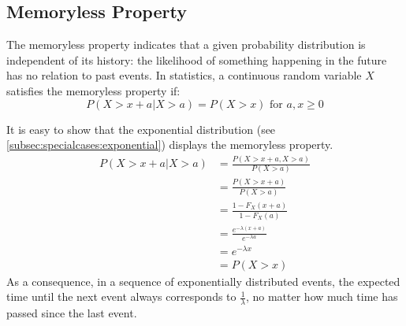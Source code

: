 \documentclass[12pt]{article}
\begin{document}

\pagebreak
\subsection{Memoryless Property}
The memoryless property indicates that a given probability distribution is independent of its history: the likelihood of
something happening in the future has no relation to past events. In statistics, a continuous random variable $X$
satisfies the memoryless property if:
 \begin{equation}
	P(X>x+a | X>a) = P(X>x)\text{ for }a, x \geq 0
 \end{equation}

 It is easy to show that the exponential distribution (see \autoref{subsec:specialcases:exponential}) displays the
 memoryless property.
 \begin{equation}
	 \begin{split}
		 P(X>x+a | X>a)	&=	\frac{P(X>x+a, X>a)}{P(X>a)}\\
		 				&=	\frac{P(X>x+a)}{P(X>a)}\\
						&=	\frac{1-F_X(x+a)}{1-F_X(a)}\\
						&=	\frac{e^{-\lambda(x+a)}}{e^{-\lambda a}}\\
						&=	e^{-\lambda x}\\
						&=	P(X>x)
	 \end{split}
 \end{equation}
As a consequence, in a sequence of exponentially distributed events, the expected time until the next event always
corresponds to $\frac{1}{\lambda}$, no matter how much time has passed since the last event.
\end{document}
